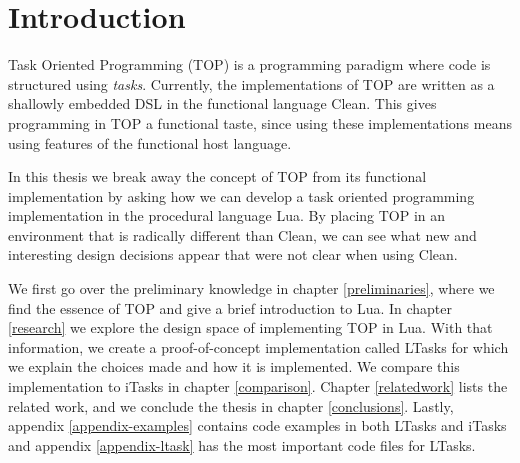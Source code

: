 \chapter{Introduction}\label{introduction}

Task Oriented Programming (TOP) is a programming paradigm where code is structured using \textit{tasks}. Currently, the implementations of TOP are written as a shallowly embedded DSL in the functional language Clean. This gives programming in TOP a functional taste, since using these implementations means using features of the functional host language.

In this thesis we break away the concept of TOP from its functional implementation by asking how we can develop a task oriented programming implementation in the procedural language Lua.
By placing TOP in an environment that is radically different than Clean, we can see what new and interesting design decisions appear that were not clear when using Clean.

We first go over the preliminary knowledge in chapter \ref{preliminaries}, where we find the essence of TOP and give a brief introduction to Lua. In chapter \ref{research} we explore the design space of implementing TOP in Lua. With that information, we create a proof-of-concept implementation called LTasks for which we explain the choices made and how it is implemented. We compare this implementation to iTasks in chapter \ref{comparison}. Chapter \ref{relatedwork} lists the related work, and we conclude the thesis in chapter \ref{conclusions}. Lastly, appendix \ref{appendix-examples} contains code examples in both LTasks and iTasks and appendix \ref{appendix-ltask} has the most important code files for LTasks.

